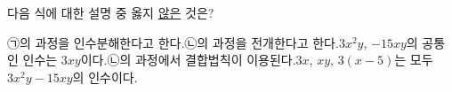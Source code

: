 다음 식에 대한 설명 중 옳지 \underline{않은} 것은?
\begin{choicesv}{㉠의 과정을 인수분해한다고 한다.}{㉡의 과정을 전개한다고 한다.}{$3x^2y$, $-15xy$의 공통인 인수는 $3xy$이다.}{㉡의 과정에서 결합법칙이 이용된다.}{$3x$, $xy$, $3(x-5)$는 모두 $3x^2y-15xy$의 인수이다.}\end{choicesv}
